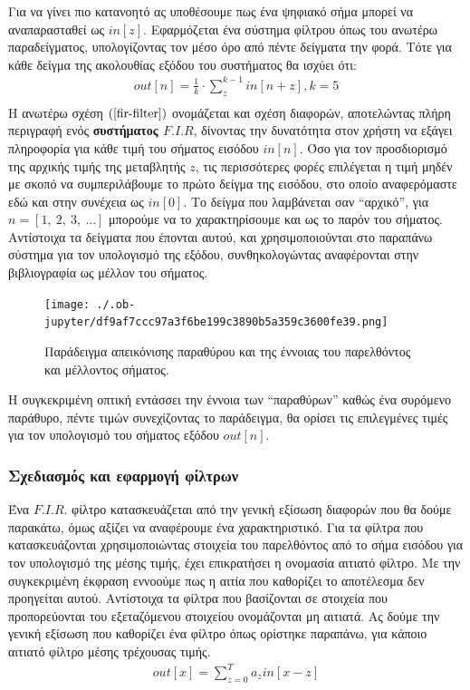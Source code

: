 \documentclass[breaklines=true, 12pt]{article}
\begin{document}
{{{Για να γίνει πιο κατανοητό ας υποθέσουμε πως ένα ψηφιακό σήμα μπορεί να αναπαρασταθεί
ως \(in[z]\). Εφαρμόζεται ένα σύστημα φίλτρου όπως του ανωτέρω παραδείγματος, υπολογίζοντας
τον μέσο όρο από πέντε δείγματα την φορά. Τότε για κάθε δείγμα της ακολουθίας εξόδου του
συστήματος θα ισχύει ότι:
\begin{equation}
\label{fir-filter}
\begin{align}
out[n] = \frac{1}{k} \cdot \sum_{z}^{{k-1}}in[n+z], k=5 \\
\end{align}
\end{equation}
Η ανωτέρω σχέση \((\ref{fir-filter})\) ονομάζεται και σχέση διαφορών, αποτελώντας πλήρη περιγραφή ενός \textbf{συστήματος
\(F.I.R\)}, δίνοντας την δυνατότητα στον χρήστη να εξάγει πληροφορία για κάθε τιμή του σήματος
εισόδου \(in[n]\). Όσο για τον προσδιορισμό της αρχικής τιμής της μεταβλητής \(z\), τις περισσότερες
φορές επιλέγεται η τιμή μηδέν με σκοπό να συμπεριλάβουμε το πρώτο δείγμα της εισόδου,
στο οποίο αναφερόμαστε εδώ και στην συνέχεια ως \(in[0]\). Το δείγμα που λαμβάνεται σαν “αρχικό”,
για \(n = [1,\ 2,\ 3,\ ...]\) μπορούμε να το χαρακτηρίσουμε και ως το παρόν του σήματος. Αντίστοιχα τα
δείγματα που έπονται αυτού, και χρησιμοποιούνται στο παραπάνω σύστημα για τον υπολογισμό
της εξόδου, συνθηκολογώντας αναφέρονται στην βιβλιογραφία ως μέλλον του σήματος.

\begin{figure}[H]
\centering
\texttt{[image: ./.ob-jupyter/df9af7ccc97a3f6be199c3890b5a359c3600fe39.png]}
\caption{\label{fig_explaining_future}Παράδειγμα απεικόνισης παραθύρου και της έννοιας του παρελθόντος και μέλλοντος σήματος.}
\end{figure}

Η συγκεκριμένη οπτική εντάσσει την έννοια των “παραθύρων” καθώς ένα συρόμενο παράθυρο, πέντε
τιμών συνεχίζοντας το παράδειγμα, θα ορίσει τις επιλεγμένες τιμές για τον υπολογισμό του
σήματος εξόδου \(out[n]\).
\subsubsection{Σχεδιασμός και εφαρμογή φίλτρων}
\label{sec:org1e8fee9}
Ένα \(F.I.R.\) φίλτρο κατασκευάζεται από την γενική εξίσωση διαφορών που θα δούμε παρακάτω,
όμως αξίζει να αναφέρουμε ένα χαρακτηριστικό. Για τα φίλτρα που κατασκευάζονται
χρησιμοποιώντας στοιχεία του παρελθόντος από το σήμα εισόδου για τον υπολογισμό της μέσης τιμής,
έχει επικρατήσει η ονομασία αιτιατό φίλτρο. Με την συγκεκριμένη έκφραση εννοούμε πως
η αιτία που καθορίζει το αποτέλεσμα δεν προηγείται αυτού. Αντίστοιχα τα φίλτρα που
βασίζονται σε στοιχεία που προπορεύονται του εξεταζόμενου στοιχείου ονομάζονται μη
αιτιατά. Ας δούμε την γενική εξίσωση που καθορίζει ένα φίλτρο όπως ορίστηκε παραπάνω,
για κάποιο αιτιατό φίλτρο μέσης τρέχουσας τιμής.
\begin{equation}
\begin{align}
out[x] = \sum_{z=0}^{{T}} a_{z} in[x-z] \\
\end{align}
\end{equation}

}}}
\end{document}
